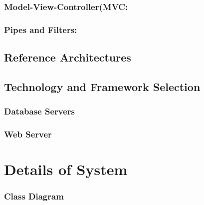 \documentclass[12pt]{article}
\begin{document}
	\subsubsection{Model-View-Controller(MVC:}



	\subsubsection{Pipes and Filters:}



	\subsection{Reference Architectures}



	\subsection{Technology and Framework Selection}



	\subsubsection{Database Servers}



	\subsubsection{Web Server}



\newpage
\section{Details of System}

	\subsubsection{Class Diagram}
	\vspace{0.5cm}
	
\end{document}
